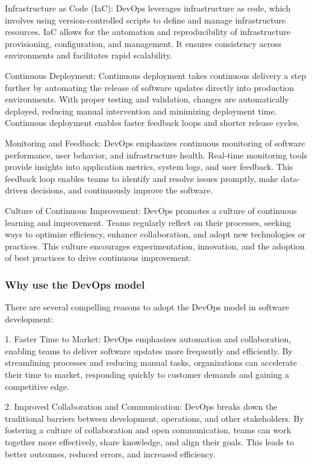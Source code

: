 \documentclass[
12pt,
oneside, 
onehalfspacing, 
nolistspacing, 
parskip, 
chapterinoneline, 
]{AASTCOMPUTER}
\begin{document}
Infrastructure as Code (IaC): DevOps leverages infrastructure as code, which involves using version-controlled scripts to define and manage infrastructure resources. IaC allows for the automation and reproducibility of infrastructure provisioning, configuration, and management. It ensures consistency across environments and facilitates rapid scalability.

Continuous Deployment: Continuous deployment takes continuous delivery a step further by automating the release of software updates directly into production environments. With proper testing and validation, changes are automatically deployed, reducing manual intervention and minimizing deployment time. Continuous deployment enables faster feedback loops and shorter release cycles.

Monitoring and Feedback: DevOps emphasizes continuous monitoring of software performance, user behavior, and infrastructure health. Real-time monitoring tools provide insights into application metrics, system logs, and user feedback. This feedback loop enables teams to identify and resolve issues promptly, make data-driven decisions, and continuously improve the software.

Culture of Continuous Improvement: DevOps promotes a culture of continuous learning and improvement. Teams regularly reflect on their processes, seeking ways to optimize efficiency, enhance collaboration, and adopt new technologies or practices. This culture encourages experimentation, innovation, and the adoption of best practices to drive continuous improvement.

\subsubsection{Why use the DevOps model}
There are several compelling reasons to adopt the DevOps model in software development:

1. Faster Time to Market: DevOps emphasizes automation and collaboration, enabling teams to deliver software updates more frequently and efficiently. By streamlining processes and reducing manual tasks, organizations can accelerate their time to market, responding quickly to customer demands and gaining a competitive edge.

2. Improved Collaboration and Communication: DevOps breaks down the traditional barriers between development, operations, and other stakeholders. By fostering a culture of collaboration and open communication, teams can work together more effectively, share knowledge, and align their goals. This leads to better outcomes, reduced errors, and increased efficiency.
\end{document}
